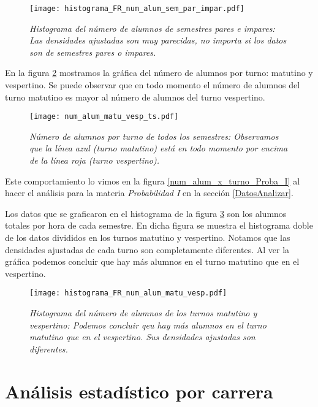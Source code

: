 \begin{figure}[H]
\centering
\texttt{[image: histograma\_FR\_num\_alum\_sem\_par\_impar.pdf]} %
\caption[\textit{Histograma del número de alumnos de semestres pares e impares}]{\textit{Histograma del número de alumnos de semestres pares e impares: Las densidades ajustadas son muy parecidas, no importa si los datos son de semestres pares o impares.}}\label{histNumAlTotal_ParImpar}
\end{figure}


En la figura \ref{NumAlTotal_MatuVesp_ts} mostramos la gráfica del número de alumnos por turno: matutino y vespertino. Se puede observar que en todo momento el número de alumnos del turno matutino es mayor al número de alumnos del turno vespertino.

\begin{figure}[H]
\centering
\texttt{[image: num\_alum\_matu\_vesp\_ts.pdf]} %
\caption[\textit{Número de alumnos por turno de todos los semestres}]{\textit{Número de alumnos por turno de todos los semestres: Observamos que la línea azul (turno matutino) está en todo momento por encima de la línea roja (turno vespertino).}}\label{NumAlTotal_MatuVesp_ts}
\end{figure}

Este comportamiento lo vimos en la figura \ref{num_alum_x_turno_Proba_I} al hacer el análisis para la materia \textit{Probabilidad I} en la sección \ref{DatosAnalizar}.

Los datos que se graficaron en el histograma de la figura \ref{histNumAlTotal_MatuVesp} son los alumnos totales por hora de cada semestre. En dicha figura se muestra el histograma doble de los datos divididos en los turnos matutino y vespertino. Notamos que las densidades ajustadas de cada turno son completamente diferentes. Al ver la gráfica podemos concluir que hay más alumnos en el turno matutino que en el vespertino.

\begin{figure}[H]
\centering
\texttt{[image: histograma\_FR\_num\_alum\_matu\_vesp.pdf]} %
\caption[\textit{Histograma del número de alumnos de los turnos matutino y vespertino}]{\textit{Histograma del número de alumnos de los turnos matutino y vespertino: Podemos concluir qeu hay más alumnos en el turno matutino que en el vespertino. Sus densidades ajustadas son diferentes.}}\label{histNumAlTotal_MatuVesp}
\end{figure}


\section{Análisis estadístico por carrera}

